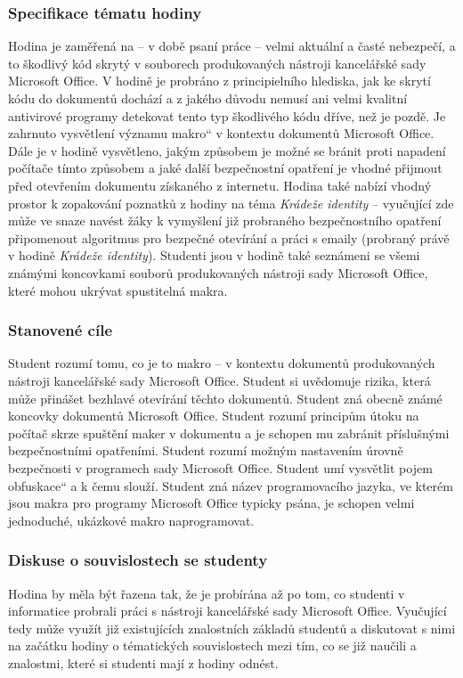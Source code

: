 \documentclass[a4paper, 12pt]{article}
\providecommand{\uv}[1]{\quotedblbase #1\textquotedblleft}
\begin{document}
\subsubsection{Specifikace tématu hodiny}
Hodina je zaměřená na -- v době psaní práce -- velmi aktuální a časté nebezpečí, a to škodlivý kód skrytý v souborech produkovaných nástroji kancelářské sady Microsoft Office. V hodině je probráno z principielního hlediska, jak ke skrytí kódu do dokumentů dochází a z jakého důvodu nemusí ani velmi kvalitní antivirové programy detekovat tento typ škodlivého kódu dříve, než je pozdě. Je zahrnuto vysvětlení významu \uv{makro} v kontextu dokumentů Microsoft Office. Dále je v hodině vysvětleno, jakým způsobem je možné se bránit proti napadení počítače tímto způsobem a jaké další bezpečnostní opatření je vhodné přijmout před otevřením dokumentu získaného z internetu. Hodina také nabízí vhodný prostor k zopakování poznatků z hodiny na téma \textit{Krádeže identity} -- vyučující zde může ve snaze navést žáky k vymyšlení již probraného bezpečnostního opatření připomenout algoritmus pro bezpečné otevírání a práci s emaily (probraný právě v hodině \textit{Krádeže identity}). Studenti jsou v hodině také seznámeni se všemi známými koncovkami souborů produkovaných nástroji sady Microsoft Office, které mohou ukrývat spustitelná makra. 

\subsubsection{Stanovené cíle}
Student rozumí tomu, co je to makro -- v kontextu dokumentů produkovaných nástroji kancelářské sady Microsoft Office. Student si uvědomuje rizika, která může přinášet bezhlavé otevírání těchto dokumentů. Student zná obecně známé koncovky dokumentů Microsoft Office. Student rozumí principům útoku na počítač skrze spuštění maker v dokumentu a je schopen mu zabránit příslušnými bezpečnostními opatřeními. Student rozumí možným nastavením úrovně bezpečnosti v programech sady Microsoft Office. Student umí vysvětlit pojem \uv{obfuskace} a k čemu slouží. Student zná název programovacího jazyka, ve kterém jsou makra pro programy Microsoft Office typicky psána, je schopen velmi jednoduché, ukázkové makro naprogramovat. 

\subsubsection{Diskuse o souvislostech se studenty}
Hodina by měla být řazena tak, že je probírána až po tom, co studenti v informatice probrali práci s nástroji kancelářské sady Microsoft Office. Vyučující tedy může využít již existujících znalostních základů studentů a diskutovat s nimi na začátku hodiny o tématických souvislostech mezi tím, co se již naučili a znalostmi, které si studenti mají z hodiny odnést. 
\end{document}
